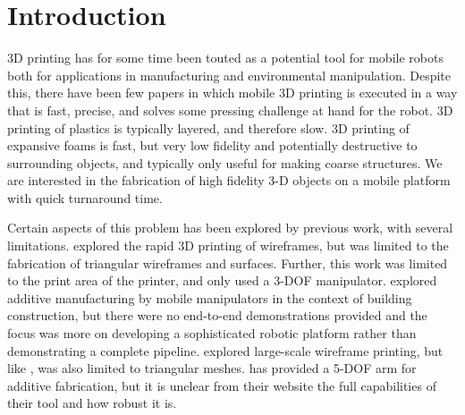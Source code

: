 \documentclass[conference]{acmsiggraph}
\begin{document}
\keywordlist


\TOGlinkslist


\copyrightspace

\section{Introduction}




3D printing has for some time been touted as a potential tool for mobile robots both for applications in manufacturing and environmental manipulation.  Despite this, there have been few papers in which mobile 3D printing is executed in a way that is fast, precise, and solves some pressing challenge at hand for the robot.  3D printing of plastics is typically layered, and therefore slow.  3D printing of expansive foams  is fast, but very low fidelity and potentially destructive to surrounding objects, and typically only useful for making coarse structures.  We are interested in the fabrication of high fidelity 3-D objects on a mobile platform with quick turnaround time.

Certain aspects of this problem has been explored by previous work, with several limitations.  \cite{WirePrint} explored the rapid 3D printing of wireframes, but was limited to the fabrication of triangular wireframes and surfaces.  Further, this work was limited to the print area of the printer, and only used a 3-DOF manipulator.  \cite{ArmFab} explored additive manufacturing by mobile manipulators in the context of building construction, but there were no end-to-end demonstrations provided and the focus was more on developing a sophisticated robotic platform rather than demonstrating a complete pipeline.  \cite{ArchFab} explored large-scale wireframe printing, but like \cite{WirePrint}, was also limited to triangular meshes.  \cite{Mataerial} has provided a 5-DOF arm for additive fabrication, but it is unclear from their website the full capabilities of their tool and how robust it is.
\end{document}
